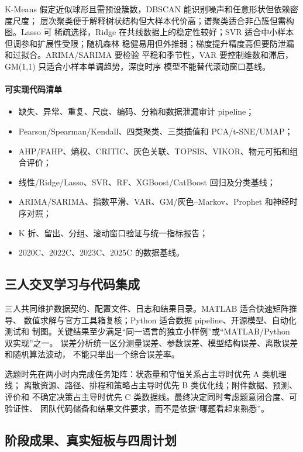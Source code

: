 \documentclass[UTF8,a4paper,12pt]{ctexart}
\begin{document}
K-Means 假定近似球形且需预设簇数，DBSCAN 能识别噪声和任意形状但依赖密度尺度；
层次聚类便于解释树状结构但大样本代价高；谱聚类适合非凸簇但需构图。Lasso 可
稀疏选择，Ridge 在共线数据上的稳定性较好；SVR 适合中小样本但调参和扩展性受限；随机森林
稳健易用但外推弱；梯度提升精度高但要防泄漏和过拟合。ARIMA/SARIMA 要检验
平稳和季节性，VAR 要控制维数和滞后，GM(1,1) 只适合小样本单调趋势，深度时序
模型不能替代滚动窗口基线。

\paragraph{可实现代码清单}
\begin{itemize}
  \item 缺失、异常、重复、尺度、编码、分箱和数据泄漏审计 pipeline；
  \item Pearson/Spearman/Kendall、四类聚类、三类插值和 PCA/t-SNE/UMAP；
  \item AHP/FAHP、熵权、CRITIC、灰色关联、TOPSIS、VIKOR、物元可拓和组合评价；
  \item 线性/Ridge/Lasso、SVR、RF、XGBoost/CatBoost 回归及分类基线；
  \item ARIMA/SARIMA、指数平滑、VAR、GM/灰色--Markov、Prophet 和神经时序对照；
  \item K 折、留出、分组、滚动窗口验证与统一指标报告；
  \item 2020C、2022C、2023C、2025C 的数据基线。
\end{itemize}

\subsection{三人交叉学习与代码集成}

三人共同维护数据契约、配置文件、日志和结果目录。MATLAB 适合快速矩阵推导、
数值求解与官方工具箱复核；Python 适合数据 pipeline、开源模型、自动化测试和
制图。关键结果至少满足“同一语言的独立小样例”或“MATLAB/Python 双实现”之一。
误差分析统一区分测量误差、参数误差、模型结构误差、离散误差和随机算法波动，
不能只举出一个综合误差率。

选题时先在两小时内完成任务矩阵：状态量和守恒关系占主导时优先 A 类机理线；
离散资源、路径、排程和策略占主导时优先 B 类优化线；附件数据、预测、评价和
不确定决策占主导时优先 C 类数据线。最终决定同时考虑题意闭合度、可验证性、
团队代码储备和结果文件要求，而不是依据“哪题看起来熟悉”。

\subsection{阶段成果、真实短板与四周计划}
\end{document}

